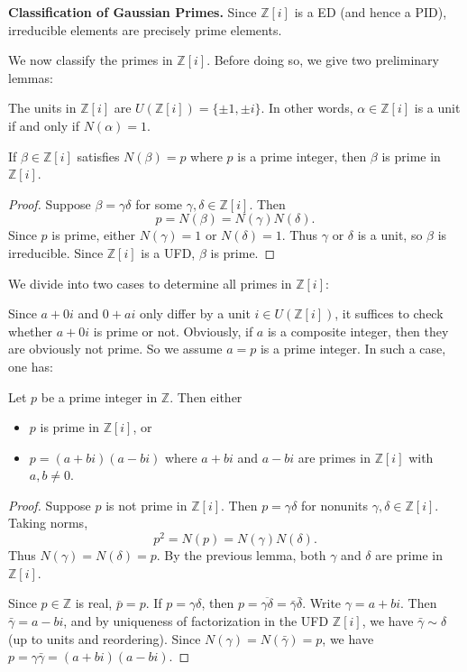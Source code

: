 \noindent \textbf{Classification of Gaussian Primes.} Since $\mathbb{Z}[i]$ is a ED (and hence a PID), irreducible elements are precisely prime elements. 

We now classify the primes in $\mathbb{Z}[i]$. Before doing so, we give two preliminary lemmas:
\begin{lemma}
The units in $\mathbb{Z}[i]$ are $U(\mathbb{Z}[i]) = \{\pm 1, \pm i\}$. In other words, $\alpha \in \mathbb{Z}[i]$ is a unit if and only if $N(\alpha) = 1$.
\end{lemma}

\begin{lemma}
If $\beta \in \mathbb{Z}[i]$ satisfies $N(\beta) = p$ where $p$ is a prime integer, then $\beta$ is prime in $\mathbb{Z}[i]$.
\end{lemma}

\begin{proof}
Suppose $\beta = \gamma \delta$ for some $\gamma, \delta \in \mathbb{Z}[i]$. Then 
\[
p = N(\beta) = N(\gamma) N(\delta).
\]
Since $p$ is prime, either $N(\gamma) = 1$ or $N(\delta) = 1$. Thus $\gamma$ or $\delta$ is a unit, so $\beta$ is irreducible. Since $\mathbb{Z}[i]$ is a UFD, $\beta$ is prime.
\end{proof}

We divide into two cases to determine all primes in $\mathbb{Z}[i]$:

\medskip
{} Since $a + 0i$ and $0 + ai$ only differ by a unit $i \in U(\mathbb{Z}[i])$, it suffices to check whether $a + 0i$ is prime or not. Obviously, if $a$ is a composite integer, then they are obviously not prime. So we assume $a = p$ is a prime integer. In such a case, one has:
\begin{lemma}
Let $p$ be a prime integer in $\mathbb{Z}$. Then either 
\begin{itemize}
\item[(i)] $p$ is prime in $\mathbb{Z}[i]$, or \item[(ii)] $p = (a + bi)(a - bi)$ where $a + bi$ and $a - bi$ are primes in $\mathbb{Z}[i]$ with $a, b \neq 0$.
\end{itemize}
\end{lemma}

\begin{proof}
Suppose $p$ is not prime in $\mathbb{Z}[i]$. Then $p = \gamma \delta$ for nonunits $\gamma, \delta \in \mathbb{Z}[i]$. Taking norms,
\[
p^2 = N(p) = N(\gamma) N(\delta).
\]
Thus $N(\gamma) = N(\delta) = p$. By the previous lemma, both $\gamma$ and $\delta$ are prime in $\mathbb{Z}[i]$.

Since $p \in \mathbb{Z}$ is real, $\bar{p} = p$. If $p = \gamma \delta$, then $p = \overline{\gamma \delta} = \bar{\gamma} \bar{\delta}$. Write $\gamma = a + bi$. Then $\bar{\gamma} = a - bi$, and by uniqueness of factorization in the UFD $\mathbb{Z}[i]$, we have $\bar{\gamma} \sim \delta$ (up to units and reordering). Since $N(\gamma) = N(\bar{\gamma}) = p$, we have $p = \gamma \bar{\gamma} = (a + bi)(a - bi)$.
\end{proof}


